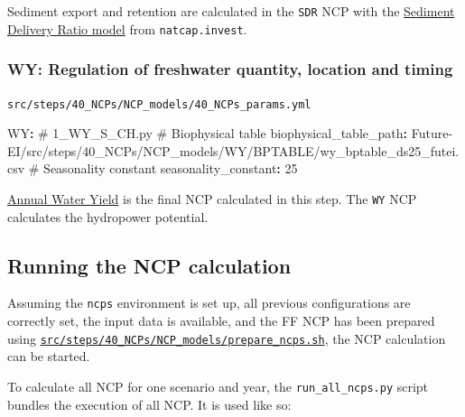 \documentclass[
  letterpaper,
  DIV=11,
  numbers=noendperiod]{scrreprt}
\newenvironment{Shaded}{\begin{snugshade}}{\end{snugshade}}
\newcommand{\AttributeTok}[1]{\textcolor[rgb]{0.40,0.45,0.13}{#1}}
\newcommand{\CommentTok}[1]{\textcolor[rgb]{0.37,0.37,0.37}{#1}}
\newcommand{\DecValTok}[1]{\textcolor[rgb]{0.68,0.00,0.00}{#1}}
\newcommand{\FunctionTok}[1]{\textcolor[rgb]{0.28,0.35,0.67}{#1}}
\newcommand{\KeywordTok}[1]{\textcolor[rgb]{0.00,0.23,0.31}{\textbf{#1}}}
\begin{document}
Sediment export and retention are calculated in the \texttt{SDR} NCP
with the
\href{https://invest.readthedocs.io/en/latest/models.html\#sediment-delivery-ratio}{Sediment
Delivery Ratio model} from \texttt{natcap.invest}.

\subsubsection{WY: Regulation of freshwater quantity, location and
timing}\label{WY}

\begin{codelisting}

\caption{\texttt{src/steps/40\_NCPs/NCP\_models/40\_NCPs\_params.yml}}

\begin{Shaded}
\begin{Highlighting}[]
\FunctionTok{WY}\KeywordTok{:}
\CommentTok{  \# 1\_WY\_S\_CH.py}
\CommentTok{  \# Biophysical table}
\AttributeTok{  }\FunctionTok{biophysical\_table\_path}\KeywordTok{:}
\AttributeTok{    Future{-}EI/src/steps/40\_NCPs/NCP\_models/WY/BPTABLE/wy\_bptable\_ds25\_futei.csv}
\CommentTok{  \# Seasonality constant}
\AttributeTok{  }\FunctionTok{seasonality\_constant}\KeywordTok{:}\AttributeTok{ }\DecValTok{25}
\end{Highlighting}
\end{Shaded}

\end{codelisting}

\href{https://invest.readthedocs.io/en/latest/models.html\#annual-water-yield}{Annual
Water Yield} is the final NCP calculated in this step. The \texttt{WY}
NCP calculates the hydropower potential.

\subsection{Running the NCP
calculation}\label{running-the-ncp-calculation}

Assuming the \texttt{ncps} environment is set up, all previous
configurations are correctly set, the input data is available, and the
FF NCP has been prepared using
\href{https://github.com/cbueth/Future-EI/tree/main/src/steps/40_NCPs/NCP_models/prepare_ncps.sh}{\texttt{src/steps/40\_NCPs/NCP\_models/prepare\_ncps.sh}},
the NCP calculation can be started.

To calculate all NCP for one scenario and year, the
\texttt{run\_all\_ncps.py} script bundles the execution of all NCP. It
is used like so:
\end{document}
